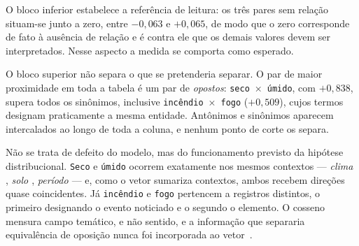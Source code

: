 \begin{table}[H]
\centering
{}
\caption{Cossenos entre pares de palavras do domínio, ordenados por proximidade.}
\label{tab:embeddings}
\end{table}

O bloco inferior estabelece a referência de leitura: os três pares sem relação situam-se junto
a zero, entre $-0{,}063$ e $+0{,}065$, de modo que o zero corresponde de fato à ausência de
relação e é contra ele que os demais valores devem ser interpretados. Nesse aspecto a medida se
comporta como esperado.

O bloco superior não separa o que se pretenderia separar. O par de maior proximidade em toda a
tabela é um par de \emph{opostos}: \texttt{seco}~×~\texttt{úmido}, com $+0{,}838$, supera
todos os sinônimos, inclusive \texttt{incêndio}~×~\texttt{fogo} ($+0{,}509$), cujos termos
designam praticamente a mesma entidade. Antônimos e sinônimos aparecem intercalados ao longo de
toda a coluna, e nenhum ponto de corte os separa.

Não se trata de defeito do modelo, mas do funcionamento previsto da hipótese distribucional.
\texttt{Seco} e \texttt{úmido} ocorrem exatamente nos mesmos contextos --- \emph{clima
\underline{\quad}}, \emph{solo \underline{\quad}}, \emph{período \underline{\quad}} --- e,
como o vetor sumariza contextos, ambos recebem direções quase coincidentes. Já
\texttt{incêndio} e \texttt{fogo} pertencem a registros distintos, o primeiro designando o
evento noticiado e o segundo o elemento. O cosseno mensura campo temático, e não sentido, e a
informação que separaria equivalência de oposição nunca foi incorporada ao
vetor~\cite{faruqui2016,schnabel2015}.

